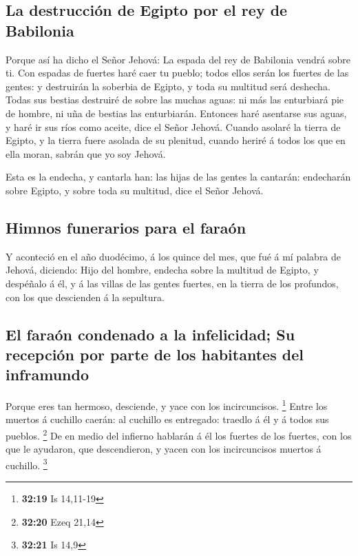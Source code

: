 \hypertarget{la-destrucciuxf3n-de-egipto-por-el-rey-de-babilonia}{%
\subsection{La destrucción de Egipto por el rey de
Babilonia}\label{la-destrucciuxf3n-de-egipto-por-el-rey-de-babilonia}}

 Porque así ha dicho el Señor Jehová: La espada del rey
de Babilonia vendrá sobre ti.  Con espadas de fuertes
haré caer tu pueblo; todos ellos serán los fuertes de las gentes: y
destruirán la soberbia de Egipto, y toda su multitud será deshecha.
 Todas sus bestias destruiré de sobre las muchas aguas:
ni más las enturbiará pie de hombre, ni uña de bestias las enturbiarán.
 Entonces haré asentarse sus aguas, y haré ir sus ríos
como aceite, dice el Señor Jehová.  Cuando asolaré la
tierra de Egipto, y la tierra fuere asolada de su plenitud, cuando
heriré á todos los que en ella moran, sabrán que yo soy Jehová.

 Esta es la endecha, y cantarla han: las hijas de las
gentes la cantarán: endecharán sobre Egipto, y sobre toda su multitud,
dice el Señor Jehová.

\hypertarget{himnos-funerarios-para-el-farauxf3n}{%
\subsection{Himnos funerarios para el
faraón}\label{himnos-funerarios-para-el-farauxf3n}}

 Y aconteció en el año duodécimo, á los quince del mes,
que fué á mí palabra de Jehová, diciendo:  Hijo del
hombre, endecha sobre la multitud de Egipto, y despéñalo á él, y á las
villas de las gentes fuertes, en la tierra de los profundos, con los que
descienden á la sepultura.

\hypertarget{el-farauxf3n-condenado-a-la-infelicidad-su-recepciuxf3n-por-parte-de-los-habitantes-del-inframundo}{%
\subsection{El faraón condenado a la infelicidad; Su recepción por parte
de los habitantes del
inframundo}\label{el-farauxf3n-condenado-a-la-infelicidad-su-recepciuxf3n-por-parte-de-los-habitantes-del-inframundo}}

 Porque eres tan hermoso, desciende, y yace con los
incircuncisos. \footnote{\textbf{32:19} Is 14,11-19} 
Entre los muertos á cuchillo caerán: al cuchillo es entregado: traedlo á
él y á todos sus pueblos. \footnote{\textbf{32:20} Ezeq 21,14}
 De en medio del infierno hablarán á él los fuertes de
los fuertes, con los que le ayudaron, que descendieron, y yacen con los
incircuncisos muertos á cuchillo. \footnote{\textbf{32:21} Is 14,9}

